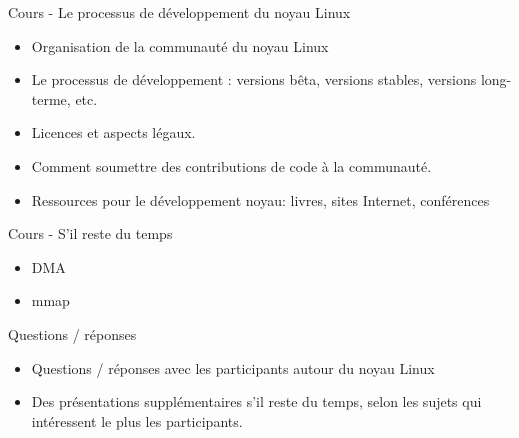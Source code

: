 \documentclass[a4paper,12pt,obeyspaces,spaces,hyphens]{article}
\begin{document}
\feagendaonecolumn
{Cours - Le processus de développement du noyau Linux}
{
  \begin{itemize}
  \item Organisation de la communauté du noyau Linux
  \item Le processus de développement : versions bêta, versions stables,
    versions long-terme, etc.
  \item Licences et aspects légaux.
  \item Comment soumettre des contributions de code à la communauté.
  \item Ressources pour le développement noyau: livres, sites Internet, conférences
  \end{itemize}
}

\newpage

\feagendatwocolumn
{Cours - S'il reste du temps}
{
  \begin{itemize}
  \item DMA
  \item mmap
  \end{itemize}
}
{Questions / réponses}
{
  \begin{itemize}
  \item Questions / réponses avec les participants autour du noyau Linux
  \item Des présentations supplémentaires s'il reste du temps, selon les sujets
	qui intéressent le plus les participants.
  \end{itemize}
}
\end{document}
